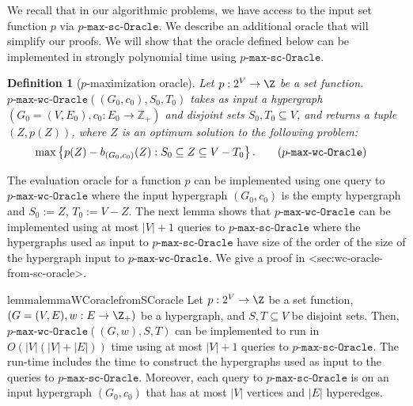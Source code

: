 \documentclass{article}
\def\Cref#1{<#1>}%
\newtheorem{definition}{Definition}[section]
\newcommand{\functionMaximizationOracle}[1]{\ensuremath{{#1}\text{-}\mathtt{max}\text{-}\mathtt{wc}\text{-}\mathtt{Oracle}}\xspace}
\newcommand{\functionMaximizationOracleStrongCover}[1]{\ensuremath{{#1}\text{-}\mathtt{max}\text{-}\mathtt{sc}\text{-}\mathtt{Oracle}}\xspace}
\newcommand{\functionMaximizationEmptyOracle}[1]
{\ensuremath{{#1}\text{-}\mathtt{max}\text{-}\mathtt{Oracle}}\xspace}
\newcommand{\knote}[1]{{\color{red}[{\tiny Karthik: \bf #1}]\marginpar{\color{red}*}}}
\begin{document}
We recall that in our algorithmic problems, we have access to the input set function $p$ via \functionMaximizationOracleStrongCover{p}. 
We describe an additional oracle that will simplify our proofs. We will show that the oracle defined below can be implemented in strongly polynomial time using \functionMaximizationOracleStrongCover{p}. 
\begin{definition}[$p$-maximization oracle]
    Let $p: 2^V\rightarrow \Z$ be a set function. 
    \functionMaximizationOracle{p}$((G_0, c_0), S_0, T_0)$ takes as input a hypergraph $(G_0=(V, E_0), c_0: E_0\rightarrow \mathbb{Z}_{+})$  
    and disjoint sets $S_0, T_0\subseteq V$, and returns a tuple $(Z, p(Z))$, where $Z$ is an optimum solution to the following problem:
    \begin{align*}
        \max & \left\{p(Z)-b_{(G_0, c_0)}(Z): S_0\subseteq Z\subseteq V-T_0\right\}. \tag{\functionMaximizationOracle{p}}\label{tag:oracle-main}
        \end{align*} 
\end{definition}
The evaluation oracle for a function $p$ can be implemented using one query to  
\functionMaximizationOracle{p} where the input hypergraph $(G_0, c_0)$ is the empty hypergraph and $S_0 := Z$, $T_0 := V - Z$. The next lemma shows that \functionMaximizationOracle{p} can be implemented using at most $|V|+1$ queries to \functionMaximizationOracleStrongCover{p} where the hypergraphs used as input to  \functionMaximizationOracleStrongCover{p} have size of the order of the size of the hypergraph input to \functionMaximizationOracle{p}. We give a proof in \Cref{sec:wc-oracle-from-sc-oracle}.  

\begin{restatable}{lemma}{lemmaWCoraclefromSCoracle}\label{lem:Preliminaries:wc-oracle-from-sc-oracle}
Let $p: 2^V\rightarrow \Z$ be a set function, $(G = (V, E), w:E\rightarrow\Z_+)$ be a hypergraph, and $S, T \subseteq V$ be disjoint sets. Then, $\functionMaximizationOracle{p}((G, w), S, T)$ can be implemented to run in $O(|V|(|V|+|E|))$ time using at most $|V|+1$ queries to $\functionMaximizationOracleStrongCover{p}$.
The run-time includes the time to construct the hypergraphs used as input to the queries to \functionMaximizationOracleStrongCover{p}. Moreover, each query to \functionMaximizationOracleStrongCover{p} is on an input hypergraph $(G_0, c_0)$ that has at most $|V|$ vertices and $|E|$ hyperedges.
\end{restatable}
\end{document}
